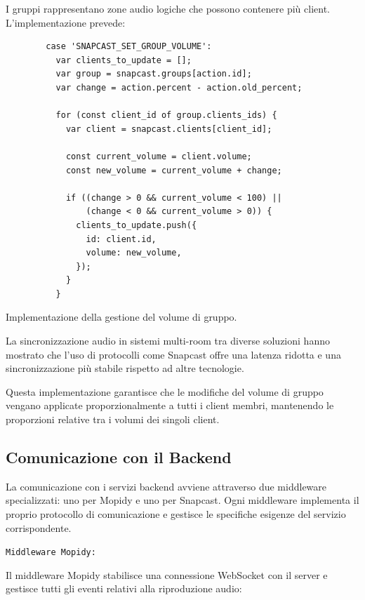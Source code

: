 I gruppi rappresentano zone audio logiche che possono contenere più client. L'implementazione prevede:

\begin{table}[h]
  \begin{algorithm}[H]
    \caption{}
    \BlankLine
      \begin{verbatim}
        case 'SNAPCAST_SET_GROUP_VOLUME':
          var clients_to_update = [];
          var group = snapcast.groups[action.id];
          var change = action.percent - action.old_percent;
  
          for (const client_id of group.clients_ids) {
            var client = snapcast.clients[client_id];
  
            const current_volume = client.volume;
            const new_volume = current_volume + change;
  
            if ((change > 0 && current_volume < 100) || 
                (change < 0 && current_volume > 0)) {
              clients_to_update.push({
                id: client.id,
                volume: new_volume,
              });
            }
          }
      \end{verbatim}
    \end{algorithm}
    \caption{Implementazione della gestione del volume di gruppo.}
    \label{tab:volume_gruppo}
\end{table}

La sincronizzazione audio in sistemi multi-room tra diverse soluzioni hanno mostrato che l'uso di protocolli come Snapcast offre una latenza ridotta e una sincronizzazione più stabile rispetto ad altre tecnologie. \cite{7990980}

Questa implementazione garantisce che le modifiche del volume di gruppo vengano applicate proporzionalmente a tutti i client membri, mantenendo le proporzioni relative tra i volumi dei singoli client.

\newpage
\subsection{Comunicazione con il Backend}

La comunicazione con i servizi backend avviene attraverso due middleware specializzati: uno per Mopidy e uno per Snapcast. Ogni middleware implementa il proprio protocollo di comunicazione e gestisce le specifiche esigenze del servizio corrispondente.

\texttt{Middleware Mopidy:}

Il middleware Mopidy stabilisce una connessione WebSocket con il server e gestisce tutti gli eventi relativi alla riproduzione audio:

